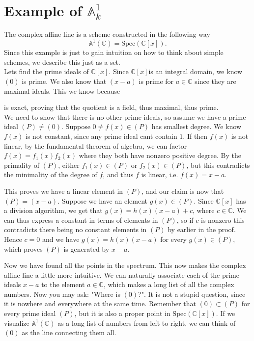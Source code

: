 \section{Example of \(\mathbb{A}_{k}^1\)}


\begin{example}\label{Ex:Complex affine line}
The complex affine line is a scheme constructed in the following way
\begin{equation*}
	\mathbb{A}^1(\mathbb{C}) = \text{Spec}(\mathbb{C}[x]) . 
\end{equation*}
Since this example is just to gain intuition on how to think about simple schemes, we describe this just as a set. \\
Lets find the prime ideals of \(\mathbb{C}[x]\). Since \(\mathbb{C}[x]\)is an integral domain, we know \((0)\) is prime. We also know that \((x-a)\) is prime for \(a \in \mathbb{C}\) since they are maximal ideals. This we know because
\begin{center}
\end{center}
is exact, proving that the quotient is a field, thus maximal, thus prime. \\
We need to show that there is no other prime ideals, so assume we have a prime ideal \((P)\neq (0)\). Suppose \(0 \neq f(x)\in (P)\) has smallest degree. We know \(f(x)\) is not constant, since any prime ideal cant contain \(1\). If then \(f(x)\) is not linear, by the fundamental theorem of algebra, we can factor \(f(x)=f_1(x)f_2(x)\) where they both have nonzero positive degree. By the primality of \((P)\), either \(f_1(x)\in (P)\) or \(f_2(x)\in (P)\), but this contradicts the minimality of the degree of \(f\), and thus \(f\) is linear, i.e. \(f(x)=x-a\). 

This proves we have a linear element in \((P)\), and our claim is now that \((P)=(x-a)\). Suppose we have an element \(g(x)\in (P)\). Since \(\mathbb{C}[x]\) has a division algorithm, we get that \(g(x)=h(x)(x-a)+c\), where \(c\in \mathbb{C}\). We can thus express a constant in terms of elements in \((P)\), so if \(c\) is nonzero this contradicts there being no constant elements in \((P)\) by earlier in the proof. Hence \(c=0\) and we have \(g(x)=h(x)(x-a)\) for every \(g(x)\in (P)\), which proves \((P)\) is generated by \(x-a\). 

Now we have found all the points in the spectrum. This now makes the complex affine line a little more intuitive. We can naturally associate each of the prime ideals \(x-a\) to the element \(a\in \mathbb{C}\), which makes a long list of all the complex numbers. Now you may ask: "Where is \((0)\)?". It is not a stupid question, since it is nowhere and everywhere at the same time. Remember that \((0)\subset (P)\) for every prime ideal \((P)\), but it is also a proper point in \(\text{Spec}(\mathbb{C}[x])\).  If we visualize \(\mathbb{A}^1(\mathbb{C})\) as a long list of numbers from left to right, we can think of \((0)\) as the line connecting them all. 


\end{example}
